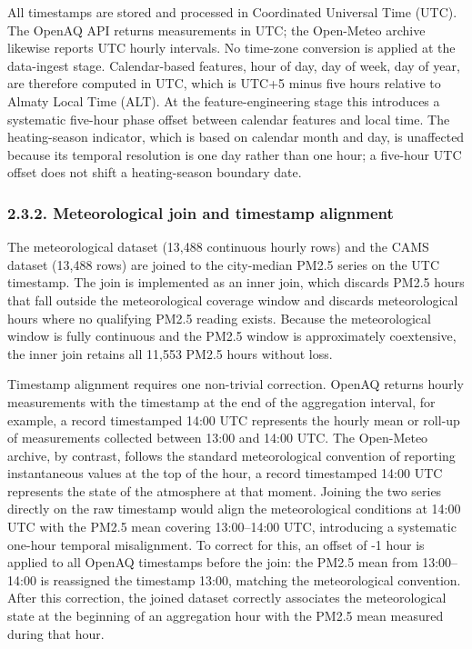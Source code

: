 All timestamps are stored and processed in Coordinated Universal Time (UTC). The OpenAQ API returns measurements in UTC; the Open-Meteo archive likewise reports UTC hourly intervals. No time-zone conversion is applied at the data-ingest stage. Calendar-based features, hour of day, day of week, day of year, are therefore computed in UTC, which is UTC+5 minus five hours relative to Almaty Local Time (ALT). At the feature-engineering stage this introduces a systematic five-hour phase offset between calendar features and local time. The heating-season indicator, which is based on calendar month and day, is unaffected because its temporal resolution is one day rather than one hour; a five-hour UTC offset does not shift a heating-season boundary date.

\subsubsection{2.3.2. Meteorological join and timestamp alignment}\label{meteorological-join-and-timestamp-alignment}

The meteorological dataset (13,488 continuous hourly rows) and the CAMS dataset (13,488 rows) are joined to the city-median PM2.5 series on the UTC timestamp. The join is implemented as an inner join, which discards PM2.5 hours that fall outside the meteorological coverage window and discards meteorological hours where no qualifying PM2.5 reading exists. Because the meteorological window is fully continuous and the PM2.5 window is approximately coextensive, the inner join retains all 11,553 PM2.5 hours without loss.

Timestamp alignment requires one non-trivial correction. OpenAQ returns hourly measurements with the timestamp at the end of the aggregation interval, for example, a record timestamped 14:00 UTC represents the hourly mean or roll-up of measurements collected between 13:00 and 14:00 UTC. The Open-Meteo archive, by contrast, follows the standard meteorological convention of reporting instantaneous values at the top of the hour, a record timestamped 14:00 UTC represents the state of the atmosphere at that moment. Joining the two series directly on the raw timestamp would align the meteorological conditions at 14:00 UTC with the PM2.5 mean covering 13:00--14:00 UTC, introducing a systematic one-hour temporal misalignment. To correct for this, an offset of -1 hour is applied to all OpenAQ timestamps before the join: the PM2.5 mean from 13:00--14:00 is reassigned the timestamp 13:00, matching the meteorological convention. After this correction, the joined dataset correctly associates the meteorological state at the beginning of an aggregation hour with the PM2.5 mean measured during that hour.

